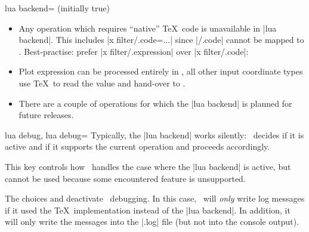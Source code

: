{\begin{pgfplotskey}{lua backend= (initially true)}
\begin{itemize}
		Both are semantically equivalent, but since \lua\ cannot interprete \TeX\ macros, it refuses to process the ``Don't'' case. The ``Don't'' case results in a log message

\texttt{Package pgfplots info on input line 16: Deactivating LUA version of plot expression for plot 0 (type 'pgfplothandlerlineto'): y expression '\textbackslash constantC *x' contains a TeX macro.}

		\item Any operation which requires ``native'' \TeX\ code is unavailable in |lua backend|. This includes |x filter/.code={...}| since |/.code| cannot be mapped to \lua. Best-practise: prefer |x filter/.expression| over |x filter/.code|:
\begin{codeexample}[]
\end{codeexample}

		\item Plot expression can be processed entirely in \lua, all other input coordinate types use \TeX\ to read the value and hand-over to \lua.

		\item There are a couple of operations for which the |lua backend| is planned for future releases.
	\end{itemize}
\end{pgfplotskey}

\begin{pgfplotskeylist}{lua debug, lua debug=}
	Typically, the |lua backend| works silently: \PGFPlots\ decides if it is active and if it supports the current operation and proceeds accordingly. 

	This key controls how \PGFPlots\ handles the case where the |lua backend| is active, but cannot be used because some encountered feature is unsupported.

	The choices  and  deactivate \lua\ debugging. In this case, \PGFPlots\ will \emph{only} write log messages if it used the \TeX\ implementation instead of the |lua backend|. In addition, it will only write the messages into the |.log| file (but not into the console output).


\end{pgfplotskeylist}}
